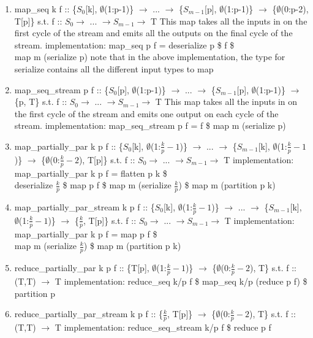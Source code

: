 \documentclass[11pt,fleqn]{article}
\numberwithin{equation}{subsection}
\begin{document}
\begin{enumerate}
    \item map\_seq k f :: \{$S_0$[k], $\emptyset$(1:p-1)\} $\rightarrow$ ...
        $\rightarrow$ \{$S_{m-1}$[p], $\emptyset$(1:p-1)\} $\rightarrow$
        \{$\emptyset$(0:p-2), T[p]\}
        \subitem s.t. f :: $S_0 \rightarrow$ ... $\rightarrow S_{m-1} \rightarrow$ T
        \subitem This map takes all the inputs in on the first cycle of the 
        stream and emits all the outputs on the final cycle of the stream.
        \subitem implementation: map\_seq p f = deserialize p \$ f \$ \\ map m (serialize p)
        \subitem note that in the above implementation, the type for serialize 
        contains all the different input types to map
    \item map\_seq\_stream p f :: \{$S_0$[p], $\emptyset$(1:p-1)\} $\rightarrow$ ...
        $\rightarrow$ \{$S_{m-1}$[p], $\emptyset$(1:p-1)\} $\rightarrow$
        \{p, T\}
        \subitem s.t. f :: $S_0 \rightarrow$ ... $\rightarrow S_{m-1} \rightarrow$ T
        \subitem This map takes all the inputs in on the first cycle of the 
        stream and emits one output on each cycle of the stream.
        \subitem implementation: map\_seq\_stream p f = f \$ map m (serialize p)
    \item map\_partially\_par k p f :: \{$S_0$[k], $\emptyset$(1:$\frac{k}{p}-1$)\} 
        $\rightarrow$ ... $\rightarrow$ 
        \{$S_{m-1}$[k], $\emptyset$(1:$\frac{k}{p}-1$)\} $\rightarrow$
        \{$\emptyset$(0:$\frac{k}{p}-2$), T[p]\}
        \subitem s.t. f :: $S_0 \rightarrow$ ... $\rightarrow S_{m-1} \rightarrow$ T
        \subitem implementation: map\_partially\_par k p f = flatten p k \$ \\ 
        deserialize $\frac{k}{p}$ \$ map p f \$ map m (serialize $\frac{k}{p}$) \$ map m (partition p k)
    \item map\_partially\_par\_stream k p f :: \{$S_0$[k], $\emptyset$(1:$\frac{k}{p}-1$)\} 
        $\rightarrow$ ... $\rightarrow$ 
        \{$S_{m-1}$[k], $\emptyset$(1:$\frac{k}{p}-1$)\} $\rightarrow$
        \{$\frac{k}{p}$, T[p]\}
        \subitem s.t. f :: $S_0 \rightarrow$ ... $\rightarrow S_{m-1} \rightarrow$ T
        \subitem implementation: map\_partially\_par k p f = map p f \$ \\ 
        map m (serialize $\frac{k}{p}$) \$ map m (partition p k)
    \item reduce\_partially\_par k p f :: \{T[p], $\emptyset$(1:$\frac{k}{p}-1$)\} 
        $\rightarrow$ \{$\emptyset$(0:$\frac{k}{p}-2$), T\}
        \subitem s.t. f :: (T,T) $\rightarrow$ T
        \subitem implementation: reduce\_seq k/p f \$ map\_seq k/p (reduce p f) 
        \$ partition p
    \item reduce\_partially\_par\_stream k p f :: \{$\frac{k}{p}$, T[p]\}
        $\rightarrow$ \{$\emptyset$(0:$\frac{k}{p}-2$), T\}
        \subitem s.t. f :: (T,T) $\rightarrow$ T
        \subitem implementation: reduce\_seq\_stream k/p f \$ reduce p f
\end{enumerate}
\end{document}
